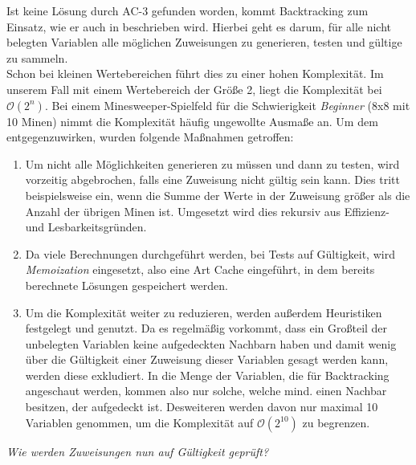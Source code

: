 Ist keine Lösung durch AC-3 gefunden worden, kommt Backtracking zum Einsatz, wie er auch in \cite{Alan} beschrieben wird. Hierbei geht es darum,
für alle nicht belegten Variablen alle möglichen Zuweisungen zu generieren, testen und gültige zu sammeln.\\ Schon bei kleinen Wertebereichen
führt dies zu einer hohen Komplexität. Im unserem Fall mit einem Wertebereich der Größe 2, liegt die Komplexität bei $\mathcal{O}(2^n)$.
Bei einem Minesweeper-Spielfeld für die Schwierigkeit \textit{Beginner} (8x8 mit 10 Minen) nimmt die Komplexität häufig ungewollte Ausmaße an.
Um dem entgegenzuwirken, wurden folgende Maßnahmen getroffen:\clearpage
\begin{enumerate}
    \item Um nicht alle Möglichkeiten generieren zu müssen und dann zu testen, wird vorzeitig abgebrochen, falls eine Zuweisung nicht gültig sein
    kann. Dies tritt beispielsweise ein, wenn die Summe der Werte in der Zuweisung größer als die Anzahl der übrigen Minen ist. Umgesetzt wird
    dies rekursiv aus Effizienz- und Lesbarkeitsgründen.
    \item Da viele Berechnungen durchgeführt werden, bei Tests auf Gültigkeit, wird \textit{Memoization} eingesetzt, also eine Art Cache eingeführt,
    in dem bereits berechnete Lösungen gespeichert werden. 
    \item Um die Komplexität weiter zu reduzieren, werden außerdem Heuristiken festgelegt und genutzt. Da es regelmäßig vorkommt, dass ein
    Großteil der unbelegten Variablen keine aufgedeckten Nachbarn haben und damit wenig über die Gültigkeit einer Zuweisung dieser Variablen
    gesagt werden kann, werden diese exkludiert. In die Menge der Variablen, die für Backtracking angeschaut werden, kommen also nur solche,
    welche mind. einen Nachbar besitzen, der aufgedeckt ist. Desweiteren werden davon nur maximal 10 Variablen genommen, um die Komplexität
    auf $\mathcal{O}(2^{10})$ zu begrenzen.
\end{enumerate}

\textit{Wie werden Zuweisungen nun auf Gültigkeit geprüft?}

